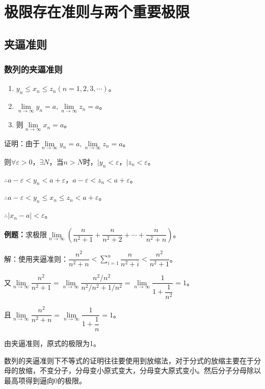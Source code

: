 \documentclass[UTF8, 12pt]{ctexart}
\begin{document}
\section{极限存在准则与两个重要极限}

\subsection{夹逼准则}

\subsubsection{数列的夹逼准则}

\begin{enumerate}
    \item $y_n\leqslant x_n\leqslant z_n(n=1,2,3,\cdots)$。
    \item $\lim\limits_{n\to\infty}y_n=a,\lim\limits_{n\to\infty}z_n=a$。
    \item 则$\lim\limits_{n\to\infty}x_n=a$。
\end{enumerate}

证明：由于$\lim\limits_{n\to\infty}y_n=a,\lim\limits_{n\to\infty}z_n=a$。

则$\forall\varepsilon>0$，$\exists N$，当$n>N$时，$\vert y_n<\varepsilon$，$\vert z_n<\varepsilon$。

$\therefore a-\varepsilon<y_n<a+\varepsilon$，$a-\varepsilon<z_n<a+\varepsilon$。

$\therefore a-\varepsilon<y_n\leqslant x_n\leqslant z_n<a+\varepsilon$。

$\therefore\vert x_n-a\vert<\varepsilon$。

\textbf{例题：}求极限$\lim\limits_{n\to\infty}\left(\dfrac{n}{n^2+1}+\dfrac{n}{n^2+2}+\cdots+\dfrac{n}{n^2+n}\right)$。

解：使用夹逼准则：$\dfrac{n^2}{n^2+n}<\sum_{i=1}^n\dfrac{n}{n^2+i}<\dfrac{n^2}{n^2+1}$。

又$\lim\limits_{n\to\infty}\dfrac{n^2}{n^2+1}=\lim\limits_{n\to\infty}\dfrac{n^2/n^2}{n^2/n^2+1/n^2}=\lim\limits_{n\to\infty}\dfrac{1}{1+\dfrac{1}{n^2}}=1$。

且$\lim\limits_{n\to\infty}\dfrac{n^2}{n^2+n}=\lim\limits_{n\to\infty}\dfrac{1}{1+\dfrac{1}{n}}=1$。

由夹逼准则，原式的极限为1。

数列的夹逼准则下不等式的证明往往要使用到放缩法，对于分式的放缩主要在于分母的放缩，不变分子，分母变小原式变大，分母变大原式变小。然后分子分母除以最高项得到逼向0的极限。
\end{document}
